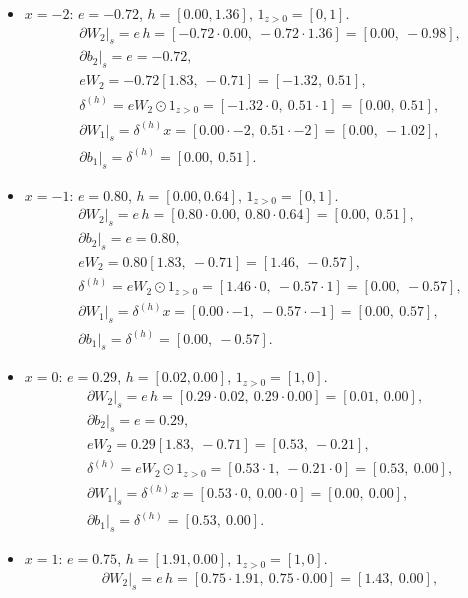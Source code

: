 \documentclass[11pt]{article}
\begin{document}
\begin{itemize}
\item $x=-2$: $e=-0.72$, $h=[0.00, 1.36]$, $1_{z>0}=[0,1]$.
\begin{align*}
&\partial W_2\big|_s = e\,h = [-0.72\cdot0.00,\ -0.72\cdot1.36] = [0.00,\ -0.98],\\
&\partial b_2\big|_s = e = -0.72,\\
&eW_2 = -0.72[1.83,\ -0.71] = [-1.32,\ 0.51],\\
&\delta^{(h)} = eW_2 \odot 1_{z>0} = [-1.32\cdot0,\ 0.51\cdot1] = [0.00,\ 0.51],\\
&\partial W_1\big|_s = \delta^{(h)} x = [0.00\cdot-2,\ 0.51\cdot-2] = [0.00,\ -1.02],\\
&\partial b_1\big|_s = \delta^{(h)} = [0.00,\ 0.51].
\end{align*}
\item $x=-1$: $e=0.80$, $h=[0.00, 0.64]$, $1_{z>0}=[0,1]$.
\begin{align*}
&\partial W_2\big|_s = e\,h = [0.80\cdot0.00,\ 0.80\cdot0.64] = [0.00,\ 0.51],\\
&\partial b_2\big|_s = e = 0.80,\\
&eW_2 = 0.80[1.83,\ -0.71] = [1.46,\ -0.57],\\
&\delta^{(h)} = eW_2 \odot 1_{z>0} = [1.46\cdot0,\ -0.57\cdot1] = [0.00,\ -0.57],\\
&\partial W_1\big|_s = \delta^{(h)} x = [0.00\cdot-1,\ -0.57\cdot-1] = [0.00,\ 0.57],\\
&\partial b_1\big|_s = \delta^{(h)} = [0.00,\ -0.57].
\end{align*}
\item $x=0$: $e=0.29$, $h=[0.02, 0.00]$, $1_{z>0}=[1,0]$.
\begin{align*}
&\partial W_2\big|_s = e\,h = [0.29\cdot0.02,\ 0.29\cdot0.00] = [0.01,\ 0.00],\\
&\partial b_2\big|_s = e = 0.29,\\
&eW_2 = 0.29[1.83,\ -0.71] = [0.53,\ -0.21],\\
&\delta^{(h)} = eW_2 \odot 1_{z>0} = [0.53\cdot1,\ -0.21\cdot0] = [0.53,\ 0.00],\\
&\partial W_1\big|_s = \delta^{(h)} x = [0.53\cdot0,\ 0.00\cdot0] = [0.00,\ 0.00],\\
&\partial b_1\big|_s = \delta^{(h)} = [0.53,\ 0.00].
\end{align*}
\item $x=1$: $e=0.75$, $h=[1.91, 0.00]$, $1_{z>0}=[1,0]$.
\begin{align*}
&\partial W_2\big|_s = e\,h = [0.75\cdot1.91,\ 0.75\cdot0.00] = [1.43,\ 0.00],\\

\end{align*}
\end{itemize}
\end{document}
